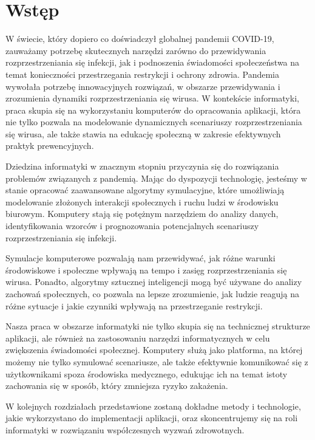 \chapter{Wstęp}
\label{ch:wstep}

W świecie, który dopiero co doświadczył globalnej pandemii COVID-19, zauważamy potrzebę skutecznych narzędzi zarówno do przewidywania rozprzestrzeniania się infekcji, jak i podnoszenia świadomości społeczeństwa na temat konieczności przestrzegania restrykcji i ochrony zdrowia. Pandemia wywołała potrzebę innowacyjnych rozwiązań, w obszarze przewidywania i zrozumienia dynamiki rozprzestrzeniania się wirusa. W kontekście informatyki, praca skupia się na wykorzystaniu komputerów do opracowania aplikacji, która nie tylko pozwala na modelowanie dynamicznych scenariuszy rozprzestrzeniania się wirusa, ale także stawia na edukację społeczną w zakresie efektywnych praktyk prewencyjnych.

Dziedzina informatyki w znacznym stopniu przyczynia się do rozwiązania problemów związanych z pandemią. Mając do dyspozycji technologię, jesteśmy w stanie opracować zaawansowane algorytmy symulacyjne, które umożliwiają modelowanie złożonych interakcji społecznych i ruchu ludzi w środowisku biurowym. Komputery stają się potężnym narzędziem do analizy danych, identyfikowania wzorców i prognozowania potencjalnych scenariuszy rozprzestrzeniania się infekcji.

Symulacje komputerowe pozwalają nam przewidywać, jak różne warunki środowiskowe i społeczne wpływają na tempo i zasięg rozprzestrzeniania się wirusa. Ponadto, algorytmy sztucznej inteligencji mogą być używane do analizy zachowań społecznych, co pozwala na lepsze zrozumienie, jak ludzie reagują na różne sytuacje i jakie czynniki wpływają na przestrzeganie restrykcji.

Nasza praca w obszarze informatyki nie tylko skupia się na technicznej strukturze aplikacji, ale również na zastosowaniu narzędzi informatycznych w celu zwiększenia świadomości społecznej. Komputery służą jako platforma, na której możemy nie tylko symulować scenariusze, ale także efektywnie komunikować się z użytkownikami spoza środowiska medycznego, edukując ich na temat istoty zachowania się w sposób, który zmniejsza ryzyko zakażenia.

W kolejnych rozdziałach przedstawione zostaną dokładne metody i technologie, jakie wykorzystano do implementacji aplikacji, oraz skoncentrujemy się na roli informatyki w rozwiązaniu współczesnych wyzwań zdrowotnych.

